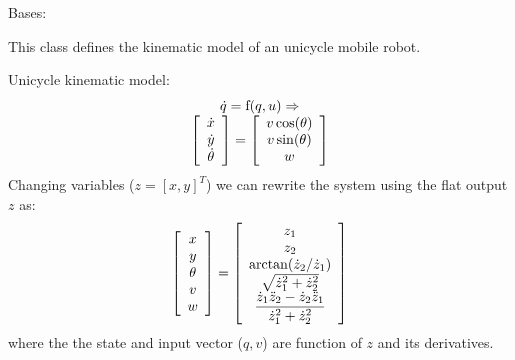 \documentclass[letterpaper,10pt,english]{sphinxmanual}
\begin{document}

\begin{fulllineitems}
\label{Multi-robot motion planner:planning_sim.UnicycleKineModel}
Bases: \href{http://docs.python.org/library/functions.html\#object}{}

This class defines the kinematic model of an unicycle mobile robot.

Unicycle kinematic model:
\begin{gather}
\begin{split}\begin{array}{c}
\dot{q} = \mathrm{f}(q, u) \Rightarrow\\
\left[\begin{array}{c}
\dot{x}\\
\dot{y}\\
\dot{\theta}
\end{array}\right]=
\left[\begin{array}{c}
v\cos(\theta)\\
v\sin(\theta)\\
w
\end{array}\right]
\end{array}\end{split}\notag
\end{gather}
Changing variables (\(z = [x, y]^T\)) we can rewrite the system using the
flat output \(z\) as:
\begin{gather}
\begin{split}\left[\begin{array}{c}
x\\
y\\
\theta\\
v\\
w
\end{array}\right]=
\left[\begin{array}{c}
z_1\\
z_2\\
\arctan(\dot{z}_2/\dot{z}_1)\\
\sqrt{\dot{z}_{1}^{2} + \dot{z}_{2}^{2}}\\
\dfrac{\dot{z}_{1}\ddot{z}_{2} - \dot{z}_{2}\ddot{z}_{1}}{\dot{z}_{1}^{2}+\dot{z}_{2}^{2}}
\end{array}\right]\end{split}\notag
\end{gather}
where the the state and input vector (\(q, v\)) are function of \(z\)
and its derivatives.


\end{fulllineitems}
\end{document}
